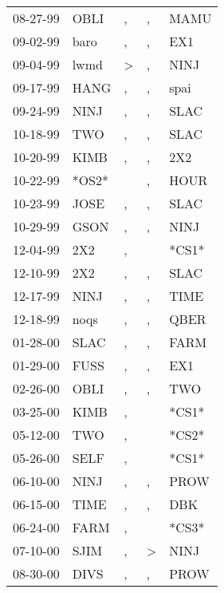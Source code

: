 \begin{supertabular}{lllll}
 08-27-99 &   OBLI &             , &             , &   MAMU \\
 09-02-99 &   baro &             , &             , &    EX1 \\
 09-04-99 &   lwmd &  \textgreater &             , &   NINJ \\
 09-17-99 &   HANG &             , &             , &   spai \\
 09-24-99 &   NINJ &             , &             , &   SLAC \\
 10-18-99 &    TWO &             , &             , &   SLAC \\
 10-20-99 &   KIMB &             , &             , &    2X2 \\
 10-22-99 &  *OS2* &               &             , &   HOUR \\
 10-23-99 &   JOSE &             , &             , &   SLAC \\
 10-29-99 &   GSON &             , &             , &   NINJ \\
 12-04-99 &    2X2 &             , &               &  *CS1* \\
 12-10-99 &    2X2 &             , &             , &   SLAC \\
 12-17-99 &   NINJ &             , &             , &   TIME \\
 12-18-99 &   noqs &             , &             , &   QBER \\
 01-28-00 &   SLAC &             , &             , &   FARM \\
 01-29-00 &   FUSS &             , &             , &    EX1 \\
 02-26-00 &   OBLI &             , &             , &    TWO \\
 03-25-00 &   KIMB &             , &               &  *CS1* \\
 05-12-00 &    TWO &             , &               &  *CS2* \\
 05-26-00 &   SELF &             , &               &  *CS1* \\
 06-10-00 &   NINJ &             , &             , &   PROW \\
 06-15-00 &   TIME &             , &             , &    DBK \\
 06-24-00 &   FARM &             , &               &  *CS3* \\
 07-10-00 &   SJIM &             , &  \textgreater &   NINJ \\
 08-30-00 &   DIVS &             , &             , &   PROW \\

\end{supertabular}
